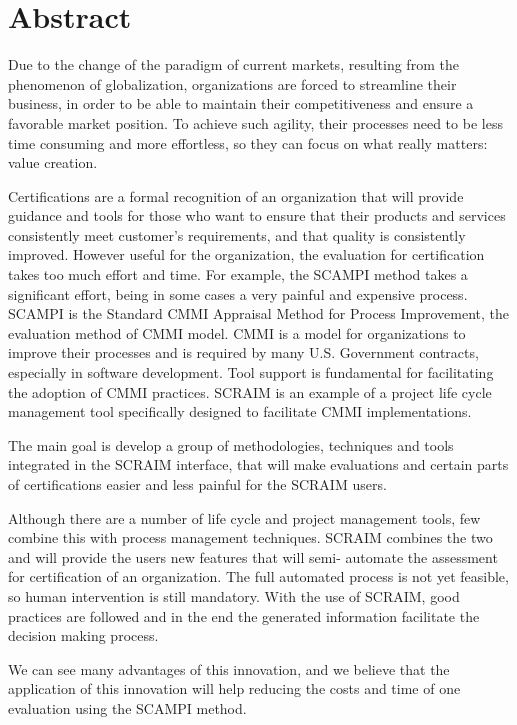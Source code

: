 \chapter*{Abstract}

Due to the change of the paradigm of current markets, resulting from the phenomenon of globalization, organizations are forced to streamline their business, in order to be able to maintain their competitiveness and ensure a favorable market position. To achieve such agility, their processes need to be less time consuming and more effortless, so they can focus on what really matters: value creation.

Certifications are a formal recognition of an organization that will provide guidance and tools for those who want to ensure that their products and services consistently meet customer's requirements, and that quality is consistently improved. However useful for the organization, the evaluation for certification takes too much effort and time. For example, the SCAMPI method takes a significant effort, being in some cases a very painful and expensive process. SCAMPI is the Standard CMMI Appraisal Method for Process Improvement, the evaluation method of CMMI model. CMMI is a model for organizations to improve their processes and is required by many U.S. Government contracts, especially in software development. 
Tool support is fundamental for facilitating the adoption of CMMI practices. SCRAIM is an example of a project life cycle management tool specifically designed to facilitate CMMI implementations.

The main goal is develop a group of methodologies, techniques and tools integrated in the SCRAIM interface, that will make evaluations and certain parts of certifications easier and less painful for the SCRAIM users.

Although there are a number of life cycle and project management tools, few combine this with process management techniques. SCRAIM combines the two and will provide the users new features that will semi- automate the assessment for certification of an organization. The full automated process is not yet feasible, so human intervention is still mandatory. With the use of SCRAIM, good practices are followed and in the end the generated information facilitate the decision making process.

We can see many advantages of this innovation, and we believe that the application of this innovation will help reducing the costs and time of one evaluation using the SCAMPI method.